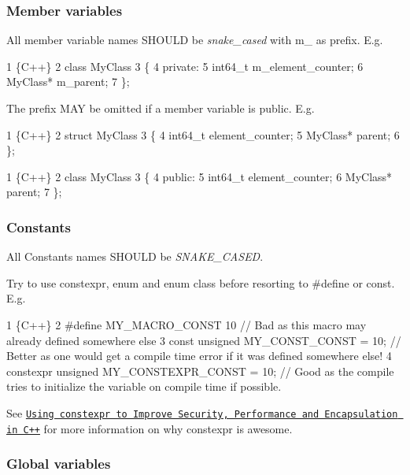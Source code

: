 \subsubsection*{Member variables}

All member variable names S\+H\+O\+U\+LD be {\itshape snake\+\_\+cased} with {\ttfamily m\+\_\+} as prefix. E.\+g. 
\begin{DoxyCode}
1 \{C++\}
2 class MyClass
3 \{
4     private:
5     int64\_t m\_element\_counter;
6     MyClass* m\_parent;
7 \};
\end{DoxyCode}


The prefix M\+AY be omitted if a member variable is {\ttfamily public}. E.\+g. 
\begin{DoxyCode}
1 \{C++\}
2 struct MyClass
3 \{
4     int64\_t element\_counter;
5     MyClass* parent;
6 \};
\end{DoxyCode}
 
\begin{DoxyCode}
1 \{C++\}
2 class MyClass
3 \{
4     public:
5     int64\_t element\_counter;
6     MyClass* parent;
7 \};
\end{DoxyCode}


\subsubsection*{Constants}

All Constants names S\+H\+O\+U\+LD be {\itshape S\+N\+A\+K\+E\+\_\+\+C\+A\+S\+ED}.

Try to use {\ttfamily constexpr}, {\ttfamily enum} and {\ttfamily enum class} before resorting to {\ttfamily \#define} or {\ttfamily const}. E.\+g. 
\begin{DoxyCode}
1 \{C++\}
2 #define MY\_MACRO\_CONST 10                   // Bad as this macro may already defined somewhere else
3 const unsigned MY\_CONST\_CONST = 10;         // Better as one would get a compile time error if it was
       defined somewhere else!
4 constexpr unsigned MY\_CONSTEXPR\_CONST = 10; // Good as the compile tries to initialize the variable on
       compile time if possible.
\end{DoxyCode}


See \href{https://smartbear.de/blog/develop/using-constexpr-to-improve-security-performance-an/?l=ua}{\tt Using constexpr to Improve Security, Performance and Encapsulation in C++} for more information on why {\ttfamily constexpr} is awesome.

\subsubsection*{Global variables}

